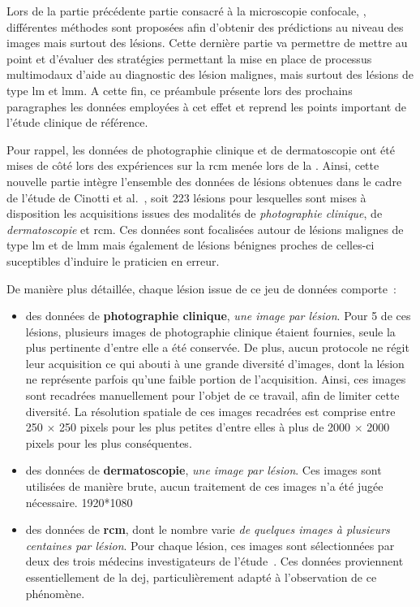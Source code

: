 \renewcommand{\thechapter}{\roman{chapter}}
\setcounter{chapter}{4}
\setcounter{figure}{0}

\label{chap:preamble_multimodal}
Lors de la partie précédente partie consacré à la microscopie confocale, , différentes méthodes sont proposées afin d'obtenir des prédictions au niveau des images mais surtout des lésions. Cette dernière partie va permettre de mettre au point et d'évaluer des stratégies permettant la mise en place de processus multimodaux d'aide au diagnostic des lésion malignes, mais surtout des lésions de type \gls{lm} et \gls{lmm}. A cette fin, ce préambule présente lors des prochains paragraphes les données employées à cet effet et reprend les points important de l'étude clinique de référence.\par

Pour rappel, les données de photographie clinique et de dermatoscopie ont été mises de côté lors des expériences sur la \gls{rcm} menée lors de la . Ainsi, cette nouvelle partie intègre l'ensemble des données de lésions obtenues dans le cadre de l'étude de Cinotti et al.~\cite{Cinotti2018}, soit 223 lésions pour lesquelles sont mises à disposition les acquisitions issues des modalités de \textit{photographie clinique}, de \textit{dermatoscopie} et \acrlong{rcm}. Ces données sont focalisées autour de lésions malignes de type \gls{lm} et de \gls{lmm} mais également de lésions bénignes proches de celles-ci suceptibles d'induire le praticien en erreur.\par 

De manière plus détaillée, chaque lésion issue de ce jeu de données comporte~:
\begin{itemize}
    \item des données de \textbf{photographie clinique}, \textit{une image par lésion}. Pour 5 de ces lésions, plusieurs images de photographie clinique étaient fournies, seule la plus pertinente d'entre elle a été conservée. De plus, aucun protocole ne régit leur acquisition ce qui abouti à une grande diversité d'images, dont la lésion ne représente parfois qu'une faible portion de l'acquisition. Ainsi, ces images sont recadrées manuellement pour l'objet de ce travail, afin de limiter cette diversité. La résolution spatiale de ces images recadrées est comprise entre 250 $\times$ 250 pixels pour les plus petites d'entre elles à plus de 2000 $\times$ 2000 pixels pour les plus conséquentes.
    \item des données de \textbf{dermatoscopie}, \textit{une image par lésion}. Ces images sont utilisées de manière brute, aucun traitement de ces images n'a été jugée nécessaire. 1920*1080
    \item des données de \textbf{\gls{rcm}}, dont le nombre varie \textit{de quelques images à plusieurs centaines par lésion}. Pour chaque lésion, ces images sont sélectionnées par deux des trois médecins investigateurs de l'étude~\cite{Cinotti2018}. Ces données proviennent essentiellement de la \gls{dej}, particulièrement adapté à l'observation de ce phénomène.
\end{itemize}

